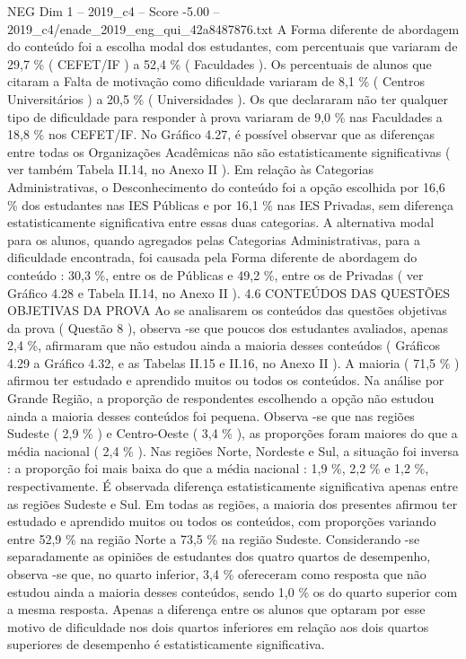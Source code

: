 \begin{textsample}{NEG Dim 1 – 2019\_c4 – Score -5.00 – 2019\_c4/enade\_2019\_eng\_qui\_42a8487876.txt}
A Forma diferente de abordagem do conteúdo foi a escolha modal dos estudantes, com percentuais que variaram de 29,7 \% ( CEFET/IF ) a 52,4 \% ( Faculdades ).
Os percentuais de alunos que citaram a Falta de motivação como dificuldade variaram de 8,1 \% ( Centros Universitários ) a 20,5 \% ( Universidades ).
Os que declararam não ter qualquer tipo de dificuldade para responder à prova variaram de 9,0 \% nas Faculdades a 18,8 \% nos CEFET/IF.
No Gráfico 4.27, é possível observar que as diferenças entre todas os Organizações Acadêmicas não são estatisticamente significativas ( ver também Tabela II.14, no Anexo II ).
Em relação às Categorias Administrativas, o Desconhecimento do conteúdo foi a opção escolhida por 16,6 \% dos estudantes nas IES Públicas e por 16,1 \% nas IES Privadas, sem diferença estatisticamente significativa entre essas duas categorias.
A alternativa modal para os alunos, quando agregados pelas Categorias Administrativas, para a dificuldade encontrada, foi causada pela Forma diferente de abordagem do conteúdo : 30,3 \%, entre os de Públicas e 49,2 \%, entre os de Privadas ( ver Gráfico 4.28 e Tabela II.14, no Anexo II ). 4.6 CONTEÚDOS DAS QUESTÕES OBJETIVAS DA PROVA Ao se analisarem os conteúdos das questões objetivas da prova ( Questão 8 ), observa -se que poucos dos estudantes avaliados, apenas 2,4 \%, afirmaram que não estudou ainda a maioria desses conteúdos ( Gráficos 4.29 a Gráfico 4.32, e as Tabelas II.15 e II.16, no Anexo II ).
A maioria ( 71,5 \% ) afirmou ter estudado e aprendido muitos ou todos os conteúdos.
Na análise por Grande Região, a proporção de respondentes escolhendo a opção não estudou ainda a maioria desses conteúdos foi pequena.
Observa -se que nas regiões Sudeste ( 2,9 \% ) e Centro-Oeste ( 3,4 \% ), as proporções foram maiores do que a média nacional ( 2,4 \% ).
Nas regiões Norte, Nordeste e Sul, a situação foi inversa : a proporção foi mais baixa do que a média nacional : 1,9 \%, 2,2 \% e 1,2 \%, respectivamente.
É observada diferença estatisticamente significativa apenas entre as regiões Sudeste e Sul.
Em todas as regiões, a maioria dos presentes afirmou ter estudado e aprendido muitos ou todos os conteúdos, com proporções variando entre 52,9 \% na região Norte a 73,5 \% na região Sudeste.
Considerando -se separadamente as opiniões de estudantes dos quatro quartos de desempenho, observa -se que, no quarto inferior, 3,4 \% ofereceram como resposta que não estudou ainda a maioria desses conteúdos, sendo 1,0 \% os do quarto superior com a mesma resposta.
Apenas a diferença entre os alunos que optaram por esse motivo de dificuldade nos dois quartos inferiores em relação aos dois quartos superiores de desempenho é estatisticamente significativa.

\end{textsample}
